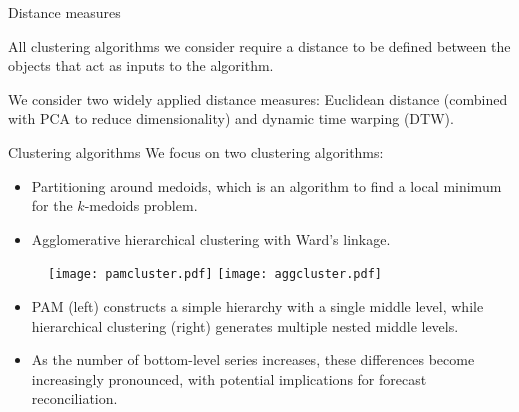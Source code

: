 \documentclass[aspectratio=169]{beamer}
\begin{document}
\begin{frame}{Distance measures}

	All clustering algorithms we consider require a distance to be defined between the objects that act as inputs to the algorithm. 
	
	We consider two widely applied distance measures: {\color{red} Euclidean distance} (combined with PCA to reduce dimensionality) and {\color{red} dynamic time warping (DTW)}.
	
	
\end{frame}

\begin{frame}{Clustering algorithms}
	We focus on two clustering algorithms:

	\begin{itemize}
		\item {\color{red} Partitioning around medoids}, which is an algorithm to find a local minimum for the $k$-medoids problem.
		\item {\color{red} Agglomerative hierarchical clustering} with Ward's linkage.
	\end{itemize}

	\begin{figure}
		\centering
		\texttt{[image: pamcluster.pdf]}
		\texttt{[image: aggcluster.pdf]}
	\end{figure}

	\begin{itemize}
		\item PAM (left) constructs {\color{red} a simple hierarchy with a single middle level}, while hierarchical clustering (right) generates {\color{red} multiple nested middle levels}.
		\item As the number of bottom-level series increases, these differences become increasingly pronounced, with potential implications for forecast reconciliation.
	\end{itemize}
\end{frame}
\end{document}
